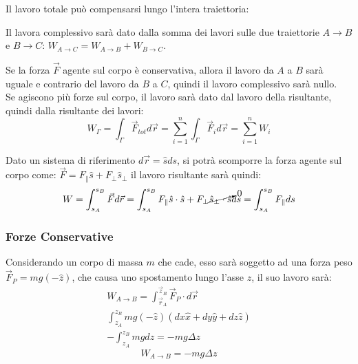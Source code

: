 \documentclass{article}
\numberwithin{equation}{subsection}
\begin{document}
Il lavoro totale può compensarsi lungo l'intera 
traiettoria:
\begin{center}\end{center}



Il lavora complessivo sarà dato dalla somma dei lavori sulle due traiettorie $A\to B$ e $B\to C$: $W_{A\to C}=W_{A\to B}+W_{B\to C}$. 


Se la forza $\vec{F}$ agente sul corpo è conservativa, allora il lavoro 
da $A$ a $B$ sarà uguale e contrario del lavoro da $B$ a $C$, 
quindi il lavoro complessivo sarà nullo.
\\
Se agiscono più forze sul corpo, il lavoro sarà dato dal 
lavoro della risultante, quindi dalla risultante dei lavori:
\begin{equation}
    W_{\Gamma}=\displaystyle\int_{\Gamma}\vec{F}_{tot}d\vec{r}=\sum_{i=1}^{n}\int_{\Gamma}\vec{F}_id\vec{r}=\sum_{i=1}^{n}W_i
\end{equation}

Dato un sistema di riferimento $d\vec{r}=\hat{s}ds$, si potrà 
scomporre la forza agente sul corpo come: $\vec{F}=F_{\parallel}\hat{s}+F_{\perp}\hat{s}_{\perp}$ 
il lavoro risultante sarà quindi: 
\begin{equation}
    W=\int_{s_A}^{s_B}\vec{F}d\vec{r}=\int_{s_A}^{s_B}F_{\parallel}\hat{s}\cdot\hat{s}+F_{\perp}\cancelto{0}{\hat{s}_{\perp}\cdot\hat{s}}ds=\int_{s_A}^{s_B}F_{\parallel}ds
\end{equation}

\subsubsection{Forze Conservative}

Considerando un corpo di massa $m$ che cade, esso sarà soggetto 
ad una forza peso $\vec{F}_P=mg(-\hat{z})$, che causa uno spostamento 
lungo l'asse $z$, il suo lavoro sarà:
\begin{gather*}
    W_{A\to B}=\displaystyle\int_{\vec{r}_A}^{\vec{z}_B}\vec{F}_P\cdot d\vec{r}\\
    \displaystyle\int_{z_A}^{z_B}mg(-\hat{z})(dx\hat{x}+dy\hat{y}+dz\hat{z})\\
    \displaystyle-\int_{z_A}^{z_B}mgdz=-mg\Delta z
\end{gather*}
\begin{equation}
    W_{A\to B}=-mg\Delta z
\end{equation}
\end{document}
